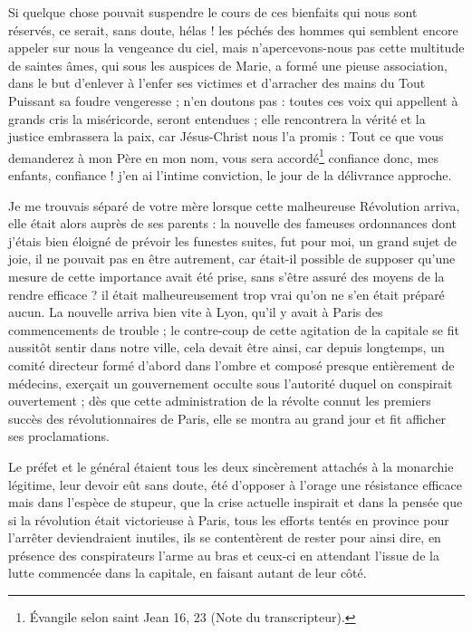 \documentclass[11pt,a4paper]{report}
\begin{document}
Si quelque chose pouvait suspendre le cours de ces bienfaits qui nous sont réservés, ce serait, sans doute, hélas ! les péchés des hommes qui semblent encore appeler sur nous la vengeance du ciel, mais n'apercevons-nous pas cette multitude de saintes âmes, qui sous les auspices de Marie, a formé une pieuse association, dans le but d'enlever à l'enfer ses victimes et d'arracher des mains du Tout Puissant sa foudre vengeresse ; n'en doutons pas : toutes ces voix qui appellent à grands cris la miséricorde, seront entendues ; elle rencontrera la vérité et la justice embrassera la paix, car Jésus-Christ nous l'a promis : Tout ce que vous demanderez à mon Père en mon nom, vous sera accordé\footnote{Évangile selon saint Jean 16, 23 (Note du transcripteur).} confiance donc, mes enfants, confiance ! j'en ai l'intime conviction, le jour de la délivrance approche.

Je me trouvais séparé de votre mère lorsque cette malheureuse Révolution arriva, elle était alors auprès de ses parents : la nouvelle des fameuses ordonnances dont j'étais bien éloigné de prévoir les funestes suites, fut pour moi, un grand sujet de joie, il ne pouvait pas en être autrement, car était-il possible de supposer qu'une mesure de cette importance avait été prise, sans s'être assuré des moyens de la rendre efficace ? il était malheureusement trop vrai qu'on ne s'en était préparé aucun. La nouvelle arriva bien vite à Lyon, qu'il y avait à Paris des commencements de trouble ; le contre-coup de cette agitation de la capitale se fit aussitôt sentir dans notre ville, cela devait être ainsi, car depuis longtemps, un comité directeur formé d'abord dans l'ombre et composé presque entièrement de médecins, exerçait un gouvernement occulte sous l'autorité duquel on conspirait ouvertement ; dès que cette administration de la révolte connut les premiers succès des révolutionnaires de Paris, elle se montra au grand jour et fit afficher ses proclamations.

Le préfet et le général étaient tous les deux sincèrement attachés à la monarchie légitime, leur devoir eût sans doute, été d'opposer à l'orage une résistance efficace mais dans l'espèce de stupeur, que la crise actuelle inspirait et dans la pensée que si la révolution était victorieuse à Paris, tous les efforts tentés en province pour l'arrêter deviendraient inutiles, ils se contentèrent de rester pour ainsi dire, en présence des conspirateurs l'arme au bras et ceux-ci en attendant l'issue de la lutte commencée dans la capitale, en faisant autant de leur côté.
\end{document}
